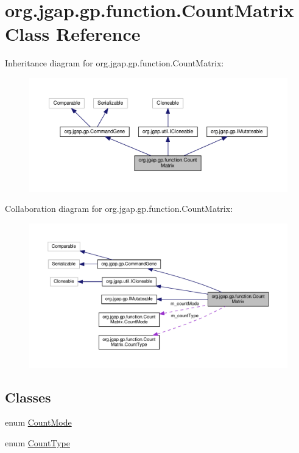 \hypertarget{classorg_1_1jgap_1_1gp_1_1function_1_1_count_matrix}{\section{org.\-jgap.\-gp.\-function.\-Count\-Matrix Class Reference}
\label{classorg_1_1jgap_1_1gp_1_1function_1_1_count_matrix}
}


Inheritance diagram for org.\-jgap.\-gp.\-function.\-Count\-Matrix\-:
\nopagebreak
\begin{figure}[H]
\begin{center}
\leavevmode
\includegraphics[width=350pt]{classorg_1_1jgap_1_1gp_1_1function_1_1_count_matrix__inherit__graph}
\end{center}
\end{figure}


Collaboration diagram for org.\-jgap.\-gp.\-function.\-Count\-Matrix\-:
\nopagebreak
\begin{figure}[H]
\begin{center}
\leavevmode
\includegraphics[width=350pt]{classorg_1_1jgap_1_1gp_1_1function_1_1_count_matrix__coll__graph}
\end{center}
\end{figure}
\subsection*{Classes}
\begin{DoxyCompactItemize}
\item 
enum \hyperlink{enumorg_1_1jgap_1_1gp_1_1function_1_1_count_matrix_1_1_count_mode}{Count\-Mode}
\item 
enum \hyperlink{enumorg_1_1jgap_1_1gp_1_1function_1_1_count_matrix_1_1_count_type}{Count\-Type}
\end{DoxyCompactItemize}
